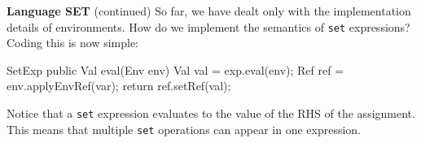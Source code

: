 \begin{minipage}[t]{\sw}
\slidenumber
\LARGE
{\bf Language SET} (continued)\exx
\emm{}\exx
So far, we have dealt only with the implementation details
of environments.  How do we implement the semantics
of \verb'set' expressions?
Coding this is now simple:
\begin{qv}
SetExp
    public Val eval(Env env) {
        Val val = exp.eval(env);
        Ref ref = env.applyEnvRef(var);
        return ref.setRef(val);
    }
\end{qv}
Notice that a \verb'set' expression evaluates
to the value of the RHS of the assignment.
This means that multiple \verb'set' operations can appear
in one expression.
\end{minipage}
